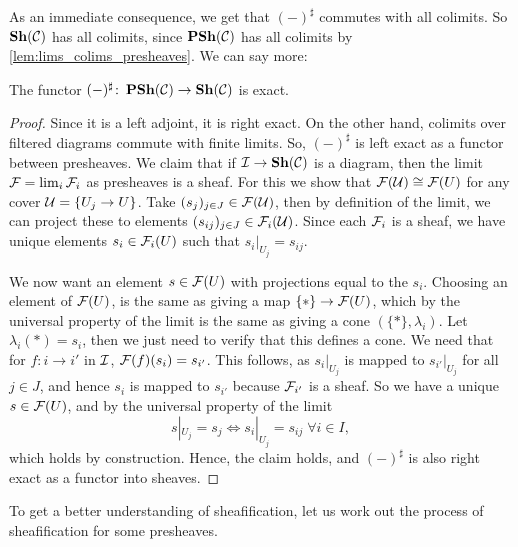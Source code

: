 \documentclass{article}
\begin{document}
As an immediate consequence, we get that $(-)^\sharp$
commutes with all colimits. So $\operatorname{\mathbf{Sh}}(\mathcal{C})$ has all colimits,
since $\operatorname{\mathbf{PSh}}(\mathcal{C})$ has all colimits by \cref{lem:lims_colims_presheaves}.
We can say more:
\begin{prop}
    \label{prop:sheafification_exact}
    The functor $(-)^\sharp\colon \operatorname{\mathbf{PSh}}(\mathcal{C}) \to \operatorname{\mathbf{Sh}}(\mathcal{C})$ is exact.
\end{prop}
\begin{proof}
    Since it is a left adjoint, it is right exact. On the other hand,
    colimits over filtered diagrams commute with finite limits.
    So, $(-)^\sharp$ is left exact as a functor between presheaves.
    We claim that if $\mathcal{I} \to \operatorname{\mathbf{Sh}}(\mathcal{C})$ is a diagram, then
    the limit $\mathcal{F} = \lim_i \mathcal{F}_i$ as presheaves is a sheaf.
    For this we show that $\mathcal{F}(\mathcal{U}) \cong \mathcal{F}(U)$ for any cover $\mathcal{U} = \{U_j \to U\}$.
    Take $(s_j)_{j\in J} \in \mathcal{F}(\mathcal{U})$, then by definition of the
    limit, we can project these to elements $(s_{ij})_{j \in J} \in \mathcal{F}_i(\mathcal{U})$.
    Since each $\mathcal{F}_i$ is a sheaf, we have unique elements $s_i \in \mathcal{F}_i(U)$
    such that $s_i |_{U_j} = s_{ij}$.

    We now want an element $s\in \mathcal{F}(U)$ with projections equal to the $s_i$.
    Choosing an element of $\mathcal{F}(U)$, is the same as giving a map $\{*\} \to \mathcal{F}(U)$,
    which by the universal property of the limit is the same as giving a cone
    $(\{*\}, \lambda_i)$. Let $\lambda_i(*) = s_i$, then we just need to verify
    that this defines a cone.
    We need that for $f\colon i\to i'$ in $\mathcal{I}$,
    $\mathcal{F}(f)(s_i) = s_{i'}$. This follows, as $s_i|_{U_j}$ is mapped to $s_{i'}|_{U_j}$
    for all $j\in J$, and hence $s_i$ is mapped to $s_{i'}$ because
    $\mathcal{F}_{i'}$ is a sheaf. So we have a unique $s\in \mathcal{F}(U)$,
    and by the universal property of the limit
    \begin{equation*}
        s|_{U_j} = s_j \iff s_i|_{U_j} = s_{ij}\; \forall i\in I,
    \end{equation*}
    which holds by construction.
    Hence, the claim holds, and $(-)^\sharp$ is also right exact as a functor
    into sheaves.
\end{proof}
To get a better understanding of sheafification, let us work out
the process of sheafification for some presheaves.
\end{document}
